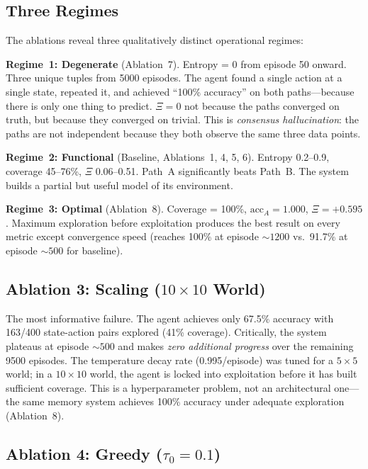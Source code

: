 \documentclass[11pt,a4paper]{article}
\begin{document}
\subsection{Three Regimes}

The ablations reveal three qualitatively distinct operational regimes:

\textbf{Regime~1: Degenerate} (Ablation~7). Entropy = 0 from episode 50 onward. Three unique tuples from 5000 episodes. The agent found a single action at a single state, repeated it, and achieved ``100\% accuracy'' on both paths---because there is only one thing to predict. $\Xi = 0$ not because the paths converged on truth, but because they converged on trivial. This is \textit{consensus hallucination}: the paths are not independent because they both observe the same three data points.

\textbf{Regime~2: Functional} (Baseline, Ablations~1, 4, 5, 6). Entropy 0.2--0.9, coverage 45--76\%, $\Xi$ 0.06--0.51. Path~A significantly beats Path~B. The system builds a partial but useful model of its environment.

\textbf{Regime~3: Optimal} (Ablation~8). Coverage = 100\%, $\text{acc}_A = 1.000$, $\Xi = +0.595$. Maximum exploration before exploitation produces the best result on every metric except convergence speed (reaches 100\% at episode ${\sim}1200$ vs.\ 91.7\% at episode ${\sim}500$ for baseline).

\subsection{Ablation 3: Scaling ($10 \times 10$ World)}

The most informative failure. The agent achieves only 67.5\% accuracy with 163/400 state-action pairs explored (41\% coverage). Critically, the system plateaus at episode ${\sim}500$ and makes \textit{zero additional progress} over the remaining 9500 episodes. The temperature decay rate (0.995/episode) was tuned for a $5 \times 5$ world; in a $10 \times 10$ world, the agent is locked into exploitation before it has built sufficient coverage. This is a hyperparameter problem, not an architectural one---the same memory system achieves 100\% accuracy under adequate exploration (Ablation~8).

\subsection{Ablation 4: Greedy ($\tau_0 = 0.1$)}
\end{document}
